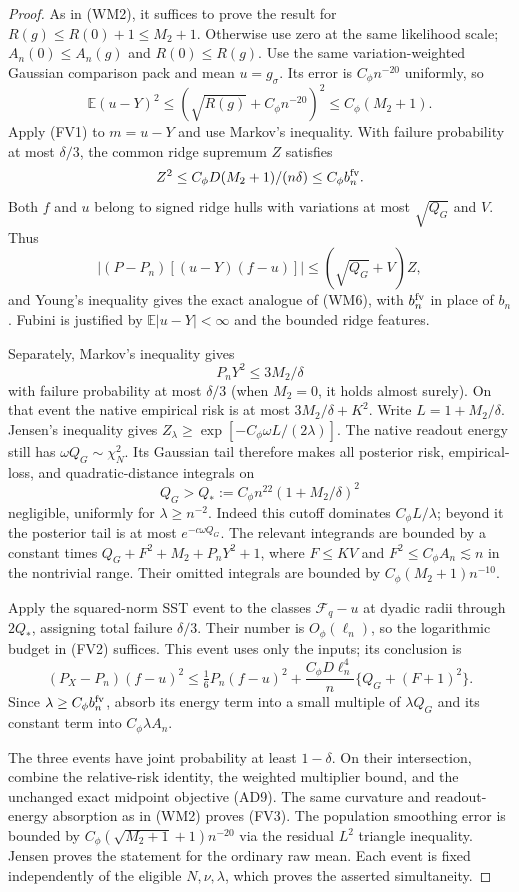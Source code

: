\begin{proof}
As in (WM2), it suffices to prove the result for
$R(g)\le R(0)+1\le M_2+1$. Otherwise use zero at the same likelihood
scale; $A_n(0)\le A_n(g)$ and $R(0)\le R(g)$.
Use the same variation-weighted Gaussian comparison pack and mean
$u=g_\sigma$. Its error is $C_\phi n^{-20}$ uniformly, so
\[
 \mathbb E(u-Y)^2
 \le(\sqrt{R(g)}+C_\phi n^{-20})^2
 \le C_\phi(M_2+1).
\]
Apply (FV1) to $m=u-Y$ and use Markov's inequality. With failure
probability at most $\delta/3$, the common ridge supremum $Z$ satisfies
\[
 Z^2\le C_\phi D(M_2+1)/(n\delta)\le C_\phi b_n^{\rm fv}.
\]
Both $f$ and $u$ belong to signed ridge hulls with variations at most
$\sqrt{Q_G}$ and $V$. Thus
\[
 |(P-P_n)[(u-Y)(f-u)]|\le(\sqrt{Q_G}+V)Z,
\]
and Young's inequality gives the exact analogue of (WM6), with
$b_n^{\rm fv}$ in place of $b_n$. Fubini is justified by
$\mathbb E|u-Y|<\infty$ and the bounded ridge features.

Separately, Markov's inequality gives
\[
 P_nY^2\le3M_2/\delta
\]
with failure probability at most $\delta/3$ (when $M_2=0$, it holds
almost surely). On that event the native empirical risk is at most
$3M_2/\delta+K^2$. Write $L=1+M_2/\delta$.
Jensen's inequality gives
$Z_\lambda\ge\exp[-C_\phi\omega L/(2\lambda)]$.
The native readout energy still has $\omega Q_G\sim\chi^2_N$.
Its Gaussian tail therefore makes all posterior risk, empirical-loss,
and quadratic-distance integrals on
\[
 Q_G>Q_*:=C_\phi n^{22}(1+M_2/\delta)^2
\]
negligible, uniformly for $\lambda\ge n^{-2}$.
Indeed this cutoff dominates $C_\phi L/\lambda$; beyond it the
posterior tail is at most $e^{-c\omega Q_G}$.
The relevant integrands are bounded by a constant times
$Q_G+F^2+M_2+P_nY^2+1$, where $F\le K V$ and
$F^2\le C_\phi A_n\lesssim n$ in the nontrivial range.
Their omitted integrals are bounded by $C_\phi(M_2+1)n^{-10}$.

Apply the squared-norm SST event to the classes $\mathcal F_q-u$ at
dyadic radii through $2Q_*$, assigning total failure $\delta/3$.
Their number is $O_\phi(\ell_n)$, so the logarithmic budget in (FV2)
suffices. This event uses only the inputs; its conclusion is
\[
 (P_X-P_n)(f-u)^2\le\tfrac16P_n(f-u)^2
 +\frac{C_\phi D\ell_n^4}{n}\{Q_G+(F+1)^2\}.
\]
Since $\lambda\ge C_\phi b_n^{\rm fv}$, absorb its energy term into
a small multiple of $\lambda Q_G$ and its constant term into
$C_\phi\lambda A_n$.

The three events have joint probability at least $1-\delta$.
On their intersection, combine the relative-risk identity, the weighted
multiplier bound, and the unchanged exact midpoint objective (AD9).
The same curvature and readout-energy absorption as in (WM2) proves
(FV3). The population smoothing error is bounded by
$C_\phi(\sqrt{M_2+1}+1)n^{-20}$ via the residual $L^2$ triangle
inequality. Jensen proves the statement for the ordinary raw mean.
Each event is fixed independently of the eligible $N,\nu,\lambda$,
which proves the asserted simultaneity.
\end{proof}

